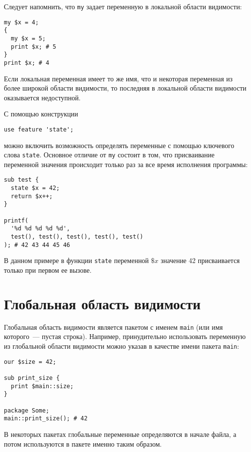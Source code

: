 Следует напомнить, что \verb|my| задает переменную в локальной области видимости:
\begin{verbatim}
my $x = 4;
{
  my $x = 5;
  print $x; # 5
}
print $x; # 4
\end{verbatim}
Если локальная переменная имеет то же имя, что и некоторая переменная из более широкой области видимости, то последняя в локальной области видимости оказывается недоступной.

С помощью конструкции
\begin{verbatim}
use feature 'state';
\end{verbatim}
можно включить возможность определять переменные с помощью ключевого слова \verb|state|. Основное отличие от \verb|my| состоит в том, что присваивание переменной значения происходит только раз за все время исполнения программы:
\begin{verbatim}
sub test {
  state $x = 42;
  return $x++;
}

printf(
  '%d %d %d %d %d',
  test(), test(), test(), test(), test()
); # 42 43 44 45 46
\end{verbatim}
В данном примере в функции \verb|state| переменной $\$x$ значение 42 присваивается только при первом ее вызове.

\section{Глобальная область видимости} %
Глобальная область видимости является пакетом с именем \verb|main| (или имя которого~--- пустая строка). Например, принудительно использовать переменную из глобальной области видимости можно указав в качестве имени пакета \verb|main|:
\begin{verbatim}
our $size = 42;

sub print_size {
  print $main::size;
}

package Some;
main::print_size(); # 42
\end{verbatim}
В некоторых пакетах глобальные переменные определяются в начале файла, а потом используются в пакете именно таким образом.

